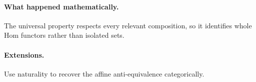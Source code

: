 \paragraph{What happened mathematically.}
The universal property respects every relevant composition, so it identifies whole Hom functors rather than isolated sets.

\paragraph{Extensions.}
Use naturality to recover the affine anti-equivalence categorically.
\fi
